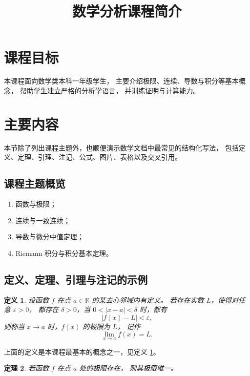\documentclass[UTF8]{ctexart}
\title{数学分析课程简介}
\date{}
\newtheorem{theorem}{定理}[section]
\newtheorem{definition}[theorem]{定义}
\numberwithin{equation}{section}
\newcommand{\RR}{\mathbb{R}}
\begin{document}
\maketitle

\section{课程目标}

本课程面向数学类本科一年级学生，
主要介绍极限、连续、导数与积分等基本概念，
帮助学生建立严格的分析学语言，
并训练证明与计算能力。

\section{主要内容}

本节除了列出课程主题外，也顺便演示数学文档中最常见的结构化写法，
包括定义、定理、引理、注记、公式、图片、表格以及交叉引用。

\subsection{课程主题概览}

\begin{enumerate}
  \item 函数与极限；
  \item 连续与一致连续；
  \item 导数与微分中值定理；
  \item Riemann 积分与积分基本定理。
\end{enumerate}

\subsection{定义、定理、引理与注记的示例}

\begin{definition}\label{def:limit}
设函数 $f$ 在点 $a \in \RR$ 的某去心邻域内有定义。
若存在实数 $L$，使得对任意 $\varepsilon>0$，
都存在 $\delta>0$，当 $0<|x-a|<\delta$ 时，都有
\[
|f(x)-L|<\varepsilon,
\]
则称当 $x\to a$ 时，$f(x)$ 的极限为 $L$，
记作
\[
\lim_{x\to a} f(x)=L.
\]
\end{definition}

上面的定义是本课程最基本的概念之一，见定义 \ref{def:limit}。

\begin{theorem}\label{thm:unique-limit}
若函数 $f$ 在点 $a$ 处的极限存在，
则其极限唯一。
\end{theorem}
\end{document}
